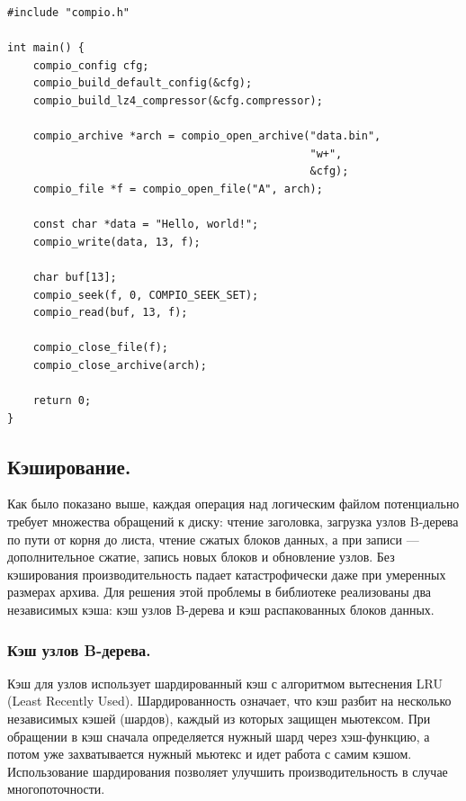 \begin{listing}[htbp]
\centering
\begin{lstlisting}[basicstyle=\ttfamily\fontsize{14}{12}\selectfont]
#include "compio.h"

int main() {
    compio_config cfg;
    compio_build_default_config(&cfg);
    compio_build_lz4_compressor(&cfg.compressor);

    compio_archive *arch = compio_open_archive("data.bin", 
                                               "w+", 
                                               &cfg);
    compio_file *f = compio_open_file("A", arch);

    const char *data = "Hello, world!";
    compio_write(data, 13, f);

    char buf[13];
    compio_seek(f, 0, COMPIO_SEEK_SET);
    compio_read(buf, 13, f);

    compio_close_file(f);
    compio_close_archive(arch);

    return 0;
}
\end{lstlisting}
\caption{Пример использования библиотеки Compio через API на C.}
\label{lst:compio_example}
\end{listing}

\subsection{Кэширование.}

Как было показано выше, каждая операция над логическим файлом потенциально требует множества обращений к диску: чтение заголовка, загрузка узлов B-дерева по пути от корня до листа, чтение сжатых блоков данных, а при записи --- дополнительное сжатие, запись новых блоков и обновление узлов. Без кэширования производительность падает катастрофически даже при умеренных размерах архива. Для решения этой проблемы в библиотеке реализованы два независимых кэша: кэш узлов B-дерева и кэш распакованных блоков данных.

\subsubsection{Кэш узлов B-дерева.}
Кэш для узлов использует шардированный кэш с алгоритмом вытеснения LRU (Least Recently Used). Шардированность означает, что кэш разбит на несколько независимых кэшей (шардов), каждый из которых защищен мьютексом. При обращении в кэш сначала определяется нужный шард через хэш-функцию, а потом уже захватывается нужный мьютекс и идет работа с самим кэшом. Использование шардирования позволяет улучшить производительность в случае многопоточности.

